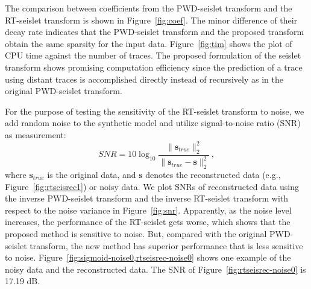 
    The comparison between coefficients from the PWD-seislet transform and 
    the RT-seislet transform is shown in Figure~\ref{fig:coef}. 
    The minor difference of their decay rate indicates that the PWD-seislet 
    transform and the proposed transform obtain the same sparsity for the input 
    data.
    Figure~\ref{fig:tim} shows the plot of CPU time against the number of 
    traces. 
    The proposed formulation of the seislet transform shows promising 
    computation efficiency since the prediction of a trace using distant 
    traces is accomplished directly instead of recursively as in the original 
    PWD-seislet transform.
    


    For the purpose of testing the sensitivity of the RT-seislet transform to 
    noise, we add random noise to the synthetic model and utilize 
    signal-to-noise ratio (SNR) as measurement: 
    \begin{equation}
        \label{snr}
        SNR=10\log_{10}\frac{\|\mathbf{s}_{true}\|^2_2}
        {\|\mathbf{s}_{true}-\mathbf{s}\|^2_2}\,,
    \end{equation}
    where $\mathbf{s}_{true}$ is the original data, and $\mathbf{s}$ denotes
    the reconstructed data (e.g., Figure~\ref{fig:rtseisrec1}) or noisy data.
    We plot SNRs of reconstructed data using the inverse PWD-seislet transform 
    and the inverse RT-seislet transform with respect to the noise variance in 
    Figure~\ref{fig:snr}. 
    Apparently, as the noise level increases, the performance of the RT-seislet 
    gets worse, which shows that the proposed method is sensitive to noise. 
    But, compared with the original PWD-seislet transform, the new method has 
    superior performance that is less sensitive to noise.
    Figure~\ref{fig:sigmoid-noise0,rtseisrec-noise0} shows one example of the
    noisy data and the reconstructed data. The SNR of 
    Figure~\ref{fig:rtseisrec-noise0} is 17.19 dB.


